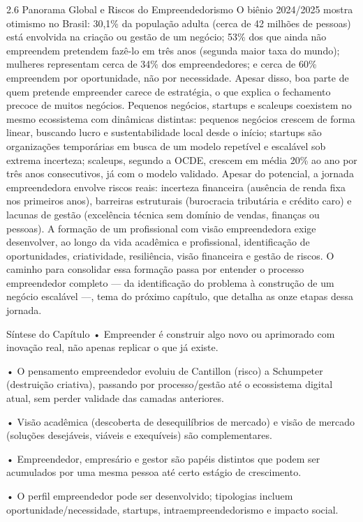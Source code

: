 2.6 Panorama Global e Riscos do Empreendedorismo O biênio 2024/2025 mostra otimismo no Brasil: 30,1\% da população adulta (cerca de 42 milhões de pessoas) está envolvida na criação ou gestão de um negócio; 53\% dos que ainda não empreendem pretendem fazê-lo em três anos (segunda maior taxa do mundo); mulheres representam cerca de 34\% dos empreendedores; e cerca de 60\% empreendem por oportunidade, não por necessidade. Apesar disso, boa parte de quem pretende empreender carece de estratégia, o que explica o fechamento precoce de muitos negócios. Pequenos negócios, startups e scaleups coexistem no mesmo ecossistema com dinâmicas distintas: pequenos negócios crescem de forma linear, buscando lucro e sustentabilidade local desde o início; startups são organizações temporárias em busca de um modelo repetível e escalável sob extrema incerteza; scaleups, segundo a OCDE, crescem em média 20\% ao ano por três anos consecutivos, já com o modelo validado. Apesar do potencial, a jornada empreendedora envolve riscos reais: incerteza financeira (ausência de renda fixa nos primeiros anos), barreiras estruturais (burocracia tributária e crédito caro) e lacunas de gestão (excelência técnica sem domínio de vendas, finanças ou pessoas). A formação de um profissional com visão empreendedora exige desenvolver, ao longo da vida acadêmica e profissional, identificação de oportunidades, criatividade, resiliência, visão financeira e gestão de riscos. O caminho para consolidar essa formação passa por entender o processo empreendedor completo — da identificação do problema à construção de um negócio escalável —, tema do próximo capítulo, que detalha as onze etapas dessa jornada.

Síntese do Capítulo • Empreender é construir algo novo ou aprimorado com inovação real, não apenas replicar o que já existe.

• O pensamento empreendedor evoluiu de Cantillon (risco) a Schumpeter (destruição criativa), passando por processo/gestão até o ecossistema digital atual, sem perder validade das camadas anteriores.

• Visão acadêmica (descoberta de desequilíbrios de mercado) e visão de mercado (soluções desejáveis, viáveis e exequíveis) são complementares.

• Empreendedor, empresário e gestor são papéis distintos que podem ser acumulados por uma mesma pessoa até certo estágio de crescimento.

• O perfil empreendedor pode ser desenvolvido; tipologias incluem oportunidade/necessidade, startups, intraempreendedorismo e impacto social.


